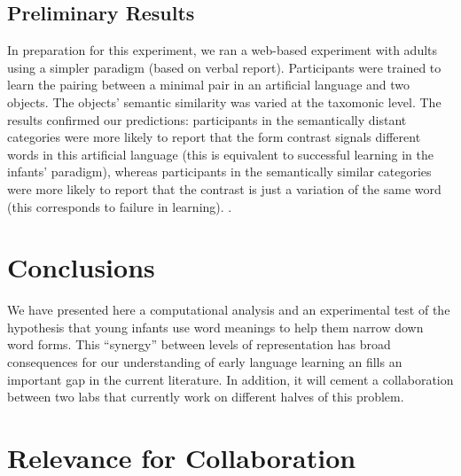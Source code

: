 \documentclass[12pt]{article}
\begin{document}

\subsection{Preliminary Results}

In preparation for this experiment, we ran a web-based experiment with adults using a simpler paradigm (based on verbal report).  Participants were trained to learn the pairing between a minimal pair in an artificial language and two objects. The objects' semantic similarity was varied at the taxomonic level. The results confirmed our predictions: participants in the semantically distant categories were more likely to report that the form contrast signals different words in this artificial language (this is equivalent  to successful learning in the infants' paradigm), whereas participants in the semantically similar categories were more likely to report that the contrast is just a variation of the same word (this corresponds to failure in learning). \cite{fourtassi2015}.

\section{Conclusions}

We have presented here a computational analysis and an experimental test of the hypothesis that young infants use word meanings to help them narrow down word forms. This ``synergy'' between levels of representation has broad consequences for our understanding of early language learning an fills an important gap in the current literature. In addition, it will cement a collaboration between two labs that currently work on different halves of this problem. 




\newpage

\section*{Relevance for Collaboration}
\end{document}
